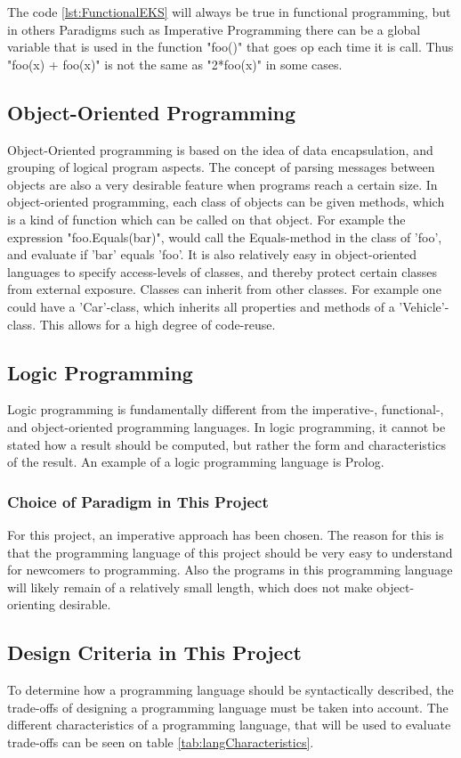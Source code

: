 The code \ref{lst:FunctionalEKS} will always be true in functional programming, but in others Paradigms such as Imperative Programming there can be a global variable that is used in the function "foo()" that goes op each time it is call. Thus "foo(x) + foo(x)" is not the same as "2*foo(x)" in some cases.
\subsection{Object-Oriented Programming}
Object-Oriented programming is based on the idea of data encapsulation, and grouping of logical program aspects. The concept of parsing messages between objects are also a very desirable feature when programs reach a certain size. In object-oriented programming, each class of objects can be given methods, which is a kind of function which can be called on that object. For example the expression "foo.Equals(bar)", would call the Equals-method in the class of 'foo', and evaluate if 'bar' equals 'foo'. It is also relatively easy in object-oriented languages to specify access-levels of classes, and thereby protect certain classes from external exposure. Classes can inherit from other classes. For example one could have a 'Car'-class, which inherits all properties and methods of a 'Vehicle'-class. This allows for a high degree of code-reuse.

\subsection{Logic Programming}
Logic programming is fundamentally different from the imperative-, functional-, and object-oriented programming languages. In logic programming, it cannot be stated how a result should be computed, but rather the form and characteristics of the result. An example of a logic programming language is Prolog.

\subsubsection{Choice of Paradigm in This Project}
For this project, an imperative approach has been chosen. The reason for this is that the programming language of this project should be very easy to understand for newcomers to programming. Also the programs in this programming language will likely remain of a relatively small length, which does not make object-orienting desirable.

\subsection{Design Criteria in This Project}
To determine how a programming language should be syntactically described, the trade-offs of designing a programming language must be taken into account. The different characteristics of a programming language, that will be used to evaluate trade-offs can be seen on table \ref{tab:langCharacteristics}.

